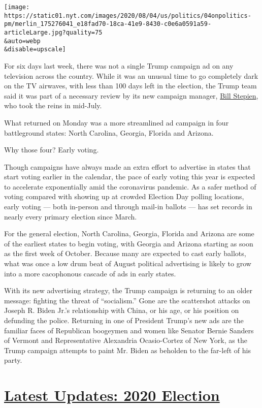\texttt{[image: https://static01.nyt.com/images/2020/08/04/us/politics/04onpolitics-pm/merlin\_175276041\_e18fad70-18ca-41e9-8430-c0e6a0591a59-articleLarge.jpg?quality=75\\\&auto=webp\\\&disable=upscale]}

For six days last week, there was not a single Trump campaign ad on any
television across the country. While it was an unusual time to go
completely dark on the TV airwaves, with less than 100 days left in the
election, the Trump team said it was part of a necessary review by its
new campaign manager,
\href{https://www.nytimes.com/article/bill-stepien.html}{Bill Stepien},
who took the reins in mid-July.

What returned on Monday was a more streamlined ad campaign in four
battleground states: North Carolina, Georgia, Florida and Arizona.

Why those four? Early voting.

Though campaigns have always made an extra effort to advertise in states
that start voting earlier in the calendar, the pace of early voting this
year is expected to accelerate exponentially amid the coronavirus
pandemic. As a safer method of voting compared with showing up at
crowded Election Day polling locations, early voting --- both in-person
and through mail-in ballots --- has set records in nearly every primary
election since March.

For the general election, North Carolina, Georgia, Florida and Arizona
are some of the earliest states to begin voting, with Georgia and
Arizona starting as soon as the first week of October. Because many are
expected to cast early ballots, what was once a low drum beat of August
political advertising is likely to grow into a more cacophonous cascade
of ads in early states.

With its new advertising strategy, the Trump campaign is returning to an
older message: fighting the threat of ``socialism.'' Gone are the
scattershot attacks on Joseph R. Biden Jr.'s relationship with China, or
his age, or his position on defunding the police. Returning in one of
President Trump's new ads are the familiar faces of Republican boogeymen
and women like Senator Bernie Sanders of Vermont and Representative
Alexandria Ocasio-Cortez of New York, as the Trump campaign attempts to
paint Mr. Biden as beholden to the far-left of his party.

\hypertarget{latest-updates-2020-election}{%
\section{\texorpdfstring{\href{https://www.nytimes.com/2020/08/04/us/elections/primary-election-michigan-arizona-kansas.html?action=click\&pgtype=Article\&state=default\&region=MAIN_CONTENT_1\&context=storylines_live_updates}{Latest
Updates: 2020
Election}}{Latest Updates: 2020 Election}}\label{latest-updates-2020-election}}

